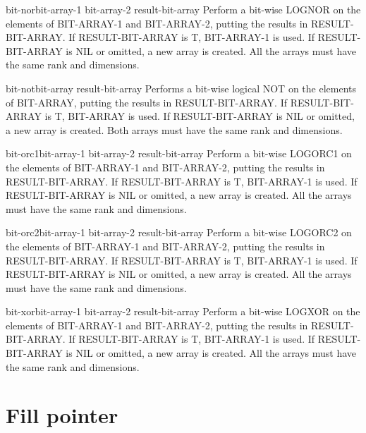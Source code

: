 \documentclass[10pt,english]{book}
\begin{document}
\begin{function}{bit-nor}{bit-array-1 bit-array-2 \op result-bit-array}
  Perform a bit-wise LOGNOR on the elements of BIT-ARRAY-1 and BIT-ARRAY-2,
  putting the results in RESULT-BIT-ARRAY. If RESULT-BIT-ARRAY is T,
  BIT-ARRAY-1 is used. If RESULT-BIT-ARRAY is NIL or omitted, a new array is
  created. All the arrays must have the same rank and dimensions.
\end{function}

\begin{function}{bit-not}{bit-array \op result-bit-array}
  Performs a bit-wise logical NOT on the elements of BIT-ARRAY,
  putting the results in RESULT-BIT-ARRAY. If RESULT-BIT-ARRAY is T,
  BIT-ARRAY is used. If RESULT-BIT-ARRAY is NIL or omitted, a new array is
  created. Both arrays must have the same rank and dimensions.
\end{function}

\begin{function}{bit-orc1}{bit-array-1 bit-array-2 \op result-bit-array}
  Perform a bit-wise LOGORC1 on the elements of BIT-ARRAY-1 and BIT-ARRAY-2,
  putting the results in RESULT-BIT-ARRAY. If RESULT-BIT-ARRAY is T,
  BIT-ARRAY-1 is used. If RESULT-BIT-ARRAY is NIL or omitted, a new array is
  created. All the arrays must have the same rank and dimensions.
\end{function}

\begin{function}{bit-orc2}{bit-array-1 bit-array-2 \op result-bit-array}
  Perform a bit-wise LOGORC2 on the elements of BIT-ARRAY-1 and BIT-ARRAY-2,
  putting the results in RESULT-BIT-ARRAY. If RESULT-BIT-ARRAY is T,
  BIT-ARRAY-1 is used. If RESULT-BIT-ARRAY is NIL or omitted, a new array is
  created. All the arrays must have the same rank and dimensions.
\end{function}

\begin{function}{bit-xor}{bit-array-1 bit-array-2 \op result-bit-array}
  Perform a bit-wise LOGXOR on the elements of BIT-ARRAY-1 and BIT-ARRAY-2,
  putting the results in RESULT-BIT-ARRAY. If RESULT-BIT-ARRAY is T,
  BIT-ARRAY-1 is used. If RESULT-BIT-ARRAY is NIL or omitted, a new array is
  created. All the arrays must have the same rank and dimensions.
\end{function}

\section{Fill pointer}
\label{sec:fill-pointer}
\end{document}
